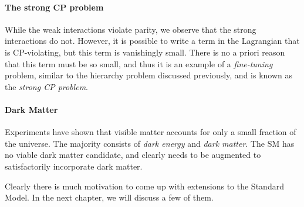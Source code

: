 \paragraph{The strong CP problem} While the weak interactions violate parity, we observe that the strong interactions do not. However, it is possible to write a term in the Lagrangian that is CP-violating, but this term is vanishingly small. There is no a priori reason that this term must be so small, and thus it is an example of a \emph{fine-tuning} problem, similar to the hierarchy problem discussed previously, and is known as the \emph{strong CP problem}.
\paragraph{Dark Matter}
Experiments have shown that visible matter accounts for only a small fraction of the universe. The majority consists of \emph{dark energy} and \emph{dark matter}. The SM has no viable dark matter candidate, and clearly needs to be augmented to satisfactorily incorporate dark matter.

Clearly there is much motivation to come up with extensions to the Standard Model. In the next chapter, we will discuss a few of them.
